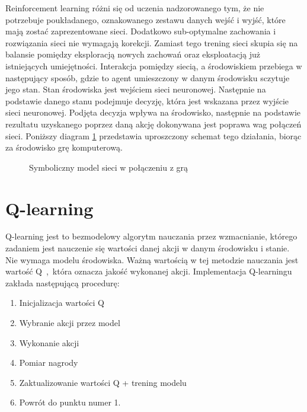 Reinforcement learning różni się od uczenia nadzorowanego tym, że nie potrzebuje poukładanego, oznakowanego zestawu danych wejść i wyjść, które mają zostać zaprezentowane sieci. Dodatkowo sub-optymalne zachowania i rozwiązania sieci nie wymagają korekcji. Zamiast tego trening sieci skupia się na balansie pomiędzy eksploracją nowych zachowań oraz eksploatacją już istniejących umiejętności.
Interakcja pomiędzy siecią, a środowiskiem przebiega w następujący sposób, gdzie to agent umieszczony w danym środowisku sczytuje jego stan. Stan środowiska jest wejściem sieci neuronowej. Następnie na podstawie danego stanu podejmuje decyzję, która jest wskazana przez wyjście sieci neuronowej. Podjęta decyzja wpływa na środowisko, następnie na podstawie rezultatu uzyskanego poprzez daną akcję dokonywana jest poprawa wag połączeń sieci. Poniższy diagram \ref{img:rf_learning_diagram} przedstawia uproszczony schemat tego działania, biorąc za środowisko grę komputerową.

\begin{figure}[h]
    \centering
    \caption{Symboliczny model sieci w połączeniu z grą}
    \label{img:rf_learning_diagram}
\end{figure}


\section{Q-learning}

Q-learning \cite{HandsOnQLearningWithPython} \cite{Qlearning} jest to bezmodelowy algorytm nauczania przez wzmacnianie, którego zadaniem jest nauczenie się wartości danej akcji w danym środowisku i stanie. Nie wymaga modelu środowiska. Ważną wartością w tej metodzie nauczania jest wartość Q~,~która oznacza jakość wykonanej akcji.
Implementacja Q-learningu zakłada następującą procedurę:

\begin{enumerate}
    \item Inicjalizacja wartości Q
    \item Wybranie akcji przez model
    \item Wykonanie akcji
    \item Pomiar nagrody
    \item Zaktualizowanie wartości Q + trening modelu
    \item Powrót do punktu numer 1.
\end{enumerate}

